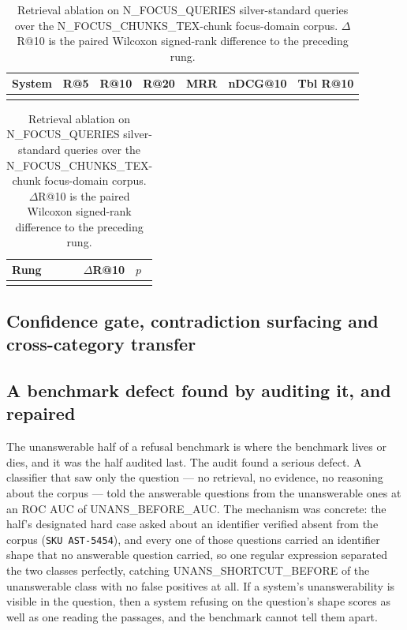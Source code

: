 \documentclass[preprint,3p,times]{elsarticle}
\begin{document}
\begin{table}[t]
\caption{Retrieval ablation on {{N_FOCUS_QUERIES}} silver-standard queries over the
{{N_FOCUS_CHUNKS_TEX}}-chunk focus-domain corpus. $\Delta$R@10 is the
paired Wilcoxon signed-rank difference to the preceding rung.}
\label{tab:ablation}
\centering
\small
\begin{tabular}{lrrrrrr}
\toprule
System & R@5 & R@10 & R@20 & MRR & nDCG@10 & Tbl R@10 \\
\midrule
 & & & & & & \\
\bottomrule
\end{tabular}
\vspace{4pt}
\begin{tabular}{lrl}
\toprule
Rung & $\Delta$R@10 & $p$ \\
\midrule
 & & \\
\bottomrule
\end{tabular}
\end{table}


\subsection{Confidence gate, contradiction surfacing and cross-category transfer}

\subsection{A benchmark defect found by auditing it, and repaired}

The unanswerable half of a refusal benchmark is where the benchmark lives or
dies, and it was the half audited last. The audit found a serious defect. A
classifier that saw only the question --- no retrieval, no evidence, no
reasoning about the corpus --- told the answerable questions from the
unanswerable ones at an ROC AUC of {{UNANS_BEFORE_AUC}}. The mechanism was
concrete: the half's designated hard case asked about an identifier verified
absent from the corpus (\texttt{SKU AST-5454}), and every one of those
questions carried an identifier shape that no answerable question carried, so
one regular expression separated the two classes perfectly, catching
{{UNANS_SHORTCUT_BEFORE}} of the unanswerable class with no false positives at
all. If a system's unanswerability is visible in the question, then a system
refusing on the question's shape scores as well as one reading the passages,
and the benchmark cannot tell them apart.
\end{document}
